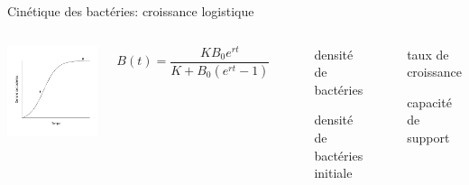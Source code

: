 \documentclass[11pt, compress, aspectratio=1610]{beamer}
\providecommand{\tightlist}{%
  \setlength{\itemsep}{0pt}\setlength{\parskip}{0pt}}
\newcommand{\begincols}{\begin{columns}}
\newcommand{\stopcols}{\end{columns}}
\begin{document}
\begin{frame}{Cinétique des bactéries: croissance logistique}

\begincols
  \centering
 \includegraphics[width=1\linewidth]{figuresAz/logistic.pdf}

\hfill{}
\[ B(t) = \dfrac{KB_0 e^{rt}}{K+B_0( e^{rt}-1)}\]

~

\begin{description}
\tightlist
\item[\(B(t)\)]
densité de bactéries
\item[\(B_0\)]
densité de bactéries initiale
\end{description}

~

\begin{description}
\tightlist
\item[r]
taux de croissance
\item[K]
capacité de support
\end{description}

\stopcols

\end{frame}
\end{document}
